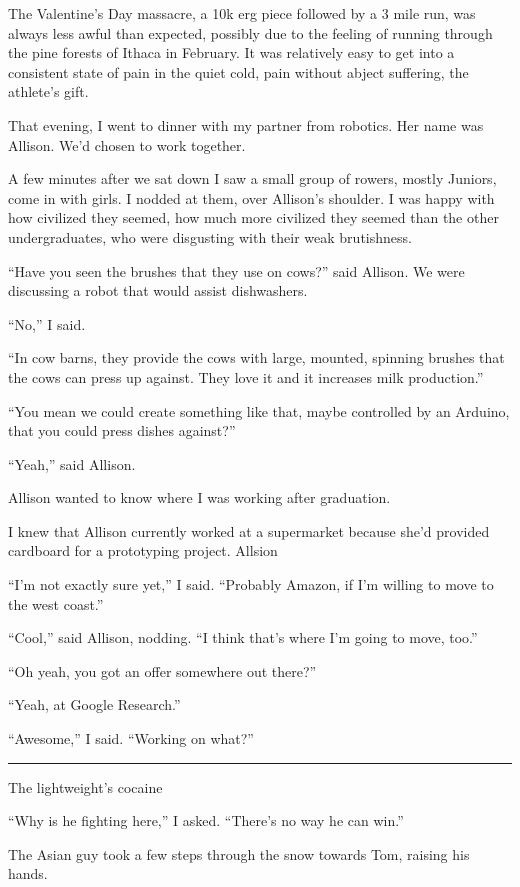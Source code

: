 The Valentine's Day massacre, a 10k erg piece followed by a 3 mile run, was
always less awful than expected, possibly due to the feeling of running through
the pine forests of Ithaca in February.  It was relatively easy to get into a
consistent state of pain in the quiet cold, pain without abject suffering, the
athlete's gift. 

That evening, I went to dinner with my partner from robotics.  Her name was
Allison.  We'd chosen to work together.  

A few minutes after we sat down I saw a small group of rowers, mostly Juniors,
come in with girls.  I nodded at them, over Allison's shoulder.  I was happy
with how civilized they seemed, how much more civilized they seemed than the
other undergraduates, who were disgusting with their weak brutishness. 

``Have you seen the brushes that they use on cows?'' said Allison.  We were
discussing a robot that would assist dishwashers.

``No,'' I said.

``In cow barns, they provide the cows with large, mounted, spinning brushes that
the cows can press up against.  They love it and it increases milk production.''

``You mean we could create something like that, maybe controlled by an Arduino,
that you could press dishes against?''

``Yeah,'' said Allison.

Allison wanted to know where I was working after graduation.

I knew that Allison currently worked at a supermarket because she'd provided
cardboard for a prototyping project.  Allsion 


``I'm not exactly sure yet,'' I said.  ``Probably Amazon, if I'm willing to move
to the west coast.''

``Cool,'' said Allison, nodding.  ``I think that's where I'm going to move,
too.''

``Oh yeah, you got an offer somewhere out there?''

``Yeah, at Google Research.''

``Awesome,'' I said.  ``Working on what?''


\plainfancybreak{12pt}{2}{* * *}


The lightweight's cocaine

``Why is he fighting here,'' I asked.  ``There's no way he can win.'' 

The Asian guy took a few steps through the snow towards Tom, raising his hands.

